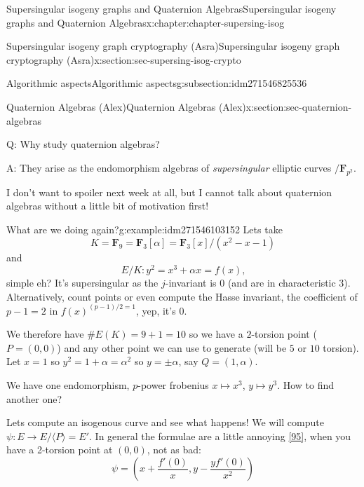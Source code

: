 \documentclass[oneside,10pt,]{book}
\numberwithin{equation}{section}
\newcommand{\FF}{\mathbf{F}}
\begin{document}
\begin{chapterptx}{Supersingular isogeny graphs and Quaternion Algebras}{}{Supersingular isogeny graphs and Quaternion Algebras}{}{}{x:chapter:chapter-supersing-isog}
\begin{sectionptx}{Supersingular isogeny graph cryptography (Asra)}{}{Supersingular isogeny graph cryptography (Asra)}{}{}{x:section:sec-supersing-isog-crypto}
\begin{subsectionptx}{Algorithmic aspects}{}{Algorithmic aspects}{}{}{g:subsection:idm271546825536}
\begin{enumerate}
\end{enumerate}
%
\end{subsectionptx}
\end{sectionptx}
%
%
\typeout{************************************************}
\typeout{************************************************}
%
\begin{sectionptx}{Quaternion Algebras (Alex)}{}{Quaternion Algebras (Alex)}{}{}{x:section:sec-quaternion-algebras}
\begin{introduction}{}%
Q: Why study quaternion algebras?%
\par
A: They arise as the endomorphism algebras of \emph{supersingular} elliptic curves \(/\FF_{p^2}\).%
\par
I don't want to spoiler next week at all, but I cannot talk about quaternion algebras without a little bit of motivation first!%
\begin{example}{What are we doing again?}{g:example:idm271546103152}%
Lets take%
\begin{equation*}
K = \FF_9 = \FF_3[\alpha] = \FF_3[x]/(x^2- x - 1)
\end{equation*}
and%
\begin{equation*}
E/K\colon y^2 = x^3 + \alpha x = f(x)\text{,}
\end{equation*}
simple eh? It's supersingular as the \(j\)-invariant is 0 (and are in characteristic 3). Alternatively, count points or even compute the Hasse invariant, the coefficient of \(p -1 = 2\) in \(f(x)^{(p-1)/2 = 1}\), yep, it's 0.%
\par
We therefore have \(\#E(K) = 9 + 1 = 10\) so we have a \(2\)-torsion point (\(P = (0,0)\)) and any other point we can use to generate (will be \(5\) or \(10\) torsion). Let \(x = 1\) so \(y^2 = 1 + \alpha = \alpha^2\) so \(y = \pm\alpha\), say \(Q = (1,\alpha)\).%
\par
We have one endomorphism, \(p\)-power frobenius \(x\mapsto x^3\), \(y\mapsto y^3\). How to find another one?%
\par
Lets compute an isogenous curve and see what happens! We will compute \(\psi\colon  E \to E/\langle P \rangle = E'\). In general the formulae are  a little annoying \hyperlink{x:biblio:bib-velu}{[95]}, when you have a 2-torsion point at \((0,0)\), not as bad:%
\begin{equation*}
\psi = \left(x + \frac{f'(0)}{x}, y - \frac{yf'(0)}{x^2} \right)
\end{equation*}
%
\begin{equation*}

\end{equation*}
\end{example}
\end{introduction}
\end{sectionptx}
\end{chapterptx}
\end{document}
